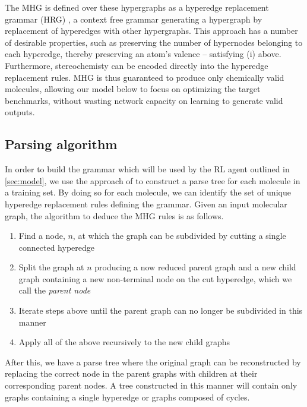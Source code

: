 \documentclass{article}
\begin{document}
The MHG is defined over these hypergraphs as a hyperedge replacement grammar (HRG) \cite{drewes1997}, a context free grammar generating a hypergraph by replacement of hyperedges with other hypergraphs. This approach has a number of desirable properties, such as preserving the number of hypernodes belonging to each hyperedge, thereby preserving an atom's valence -- satisfying (i) above. Furthermore, stereochemisty can be encoded directly into the hyperedge replacement rules. MHG is thus guaranteed to produce only chemically valid molecules, allowing our model below to focus on optimizing the target benchmarks, without wasting network capacity on learning to generate valid outputs.

\subsection{Parsing algorithm}\label{sec:parsing}
In order to build the grammar which will be used by the RL agent outlined in \ref{sec:model}, we use the approach of \cite{kajino2018} to construct a parse tree for each molecule in a training set. By doing so for each molecule, we can identify the set of unique hyperedge replacement rules defining the grammar. Given an input molecular graph, the algorithm to deduce the MHG rules is as follows.
\begin{enumerate}
	\item Find a node, $n$, at which the graph can be subdivided by cutting a single connected hyperedge 
    \item Split the graph at $n$ producing a now reduced parent graph and a new child graph containing a new non-terminal node on the cut hyperedge, which we call the {\em parent node}
    \item Iterate steps above until the parent graph can no longer be subdivided in this manner
    \item Apply all of the above recursively to the new child graphs
\end{enumerate}
After this, we have a parse tree where the original graph can be reconstructed by replacing the correct node in the parent graphs with children at their corresponding parent nodes. A tree constructed in this manner will contain only graphs containing a single hyperedge or graphs composed of cycles.
\end{document}

